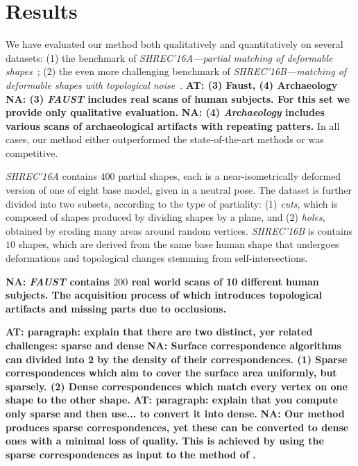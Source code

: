 \documentclass[10pt,twocolumn,letterpaper]{article}
\newcommand{\colornote}[3]{{\color{#1}\bf{#2: #3}\normalfont}}
\newcommand{\colornote}[3]{}
\newcommand {\ayellet}[1]{\colornote{blue}{AT}{#1}}
\newcommand {\nadav}[1]{\colornote{red}{NA}{#1}}
\begin{document}
\section{Results}
\label{section:results}

We have evaluated our method both qualitatively and quantitatively on several datasets:
(1) the benchmark of {\em SHREC'16A---partial matching of deformable shapes}~\cite{cosmo2016shrec};
(2) the even more challenging benchmark of {\em SHREC’16B---matching of deformable shapes with topological noise}~\cite{lahner2016shrec}.
\ayellet{(3) Faust, (4) Archaeology}
\nadav{(3) {\em FAUST}\cite{bogo2014faust} includes real scans of human subjects. For this set we provide only qualitative evaluation.}
\nadav{(4) {\em Archaeology} includes various scans of archaeological artifacts with repeating patters.}
In all cases, our method either outperformed the state-of-the-art methods or was competitive.

{\em SHREC'16A} contains $400$ partial shapes, each is a near-isometrically deformed version of one of eight base model, given in a neutral pose.
The dataset is further divided into two subsets, according to the type of partiality:
(1) \textit{cuts}, which is composed of shapes produced by dividing shapes by a plane, and (2) \textit{holes}, obtained by eroding many areas around random vertices. 
{\em SHREC’16B} is contains $10$ shapes, which are
derived from the same base human shape that undergoes deformations and topological changes stemming from self-intersections. 

\nadav{{\em FAUST} contains $200$ real world scans of 10 different human subjects. The acquisition process of which introduces topological artifacts and missing parts due to occlusions.}

\ayellet{paragraph: explain that there are two distinct, yer related challenges: sparse and dense}
\nadav{Surface correspondence algorithms can divided into 2 by the density of their correspondences. 
	(1) Sparse correspondences which aim to cover the surface area uniformly, but sparsely.
	(2) Dense correspondences which match every vertex on one shape to the other shape.}
\ayellet{paragraph: explain that you compute only sparse and then use... to convert it into dense.}
 \nadav{ Our method produces sparse correspondences, yet these can be converted to dense ones with a minimal loss of quality.
 This is achieved by using the sparse correspondences as input to the method of \cite{litany2017fully}.}
\end{document}
